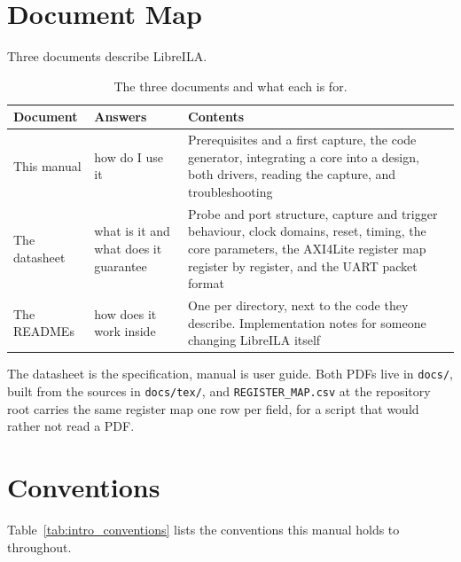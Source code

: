 \documentclass[../manual.tex]{subfiles}
\begin{document}
\section{Document Map}
\label{sec:intro_docmap}

Three documents describe LibreILA.

\begin{table}[H]
    \centering
    \begin{tabularx}{\textwidth}{|l|l|X|}
        \hline
        \rowcolor{gray!40} \textbf{Document} & \textbf{Answers} & \textbf{Contents} \\
        \hline
        This manual & how do I use it & Prerequisites and a first capture, the code generator, integrating a core into a design, both drivers, reading the capture, and troubleshooting \\
        \hline
        The datasheet & what is it and what does it guarantee & Probe and port structure, capture and trigger behaviour, clock domains, reset, timing, the core parameters, the AXI4Lite register map register by register, and the UART packet format \\
        \hline
        The READMEs & how does it work inside & One per directory, next to the code they describe. Implementation notes for someone changing LibreILA itself \\
        \hline
    \end{tabularx}
    \caption{The three documents and what each is for.}
    \label{tab:intro_docs}
\end{table}

The datasheet is the specification, manual is user guide. Both PDFs live in \texttt{docs/}, built from the sources in \texttt{docs/tex/}, and \texttt{REGISTER\_MAP.csv} at the repository root carries the same register map one row per field, for a script that would rather not read a PDF.


\section{Conventions}
\label{sec:intro_conventions}

Table~\ref{tab:intro_conventions} lists the conventions this manual holds to throughout.
\end{document}
